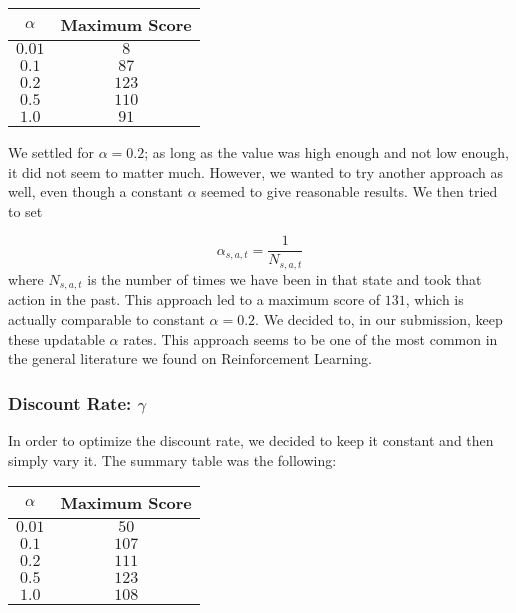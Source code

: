\documentclass[10pt]{article}
\begin{document}
\medskip

\begin{center} 
\begin{tabular}{c|c} 
\hline
$\alpha$ & Maximum Score \\ \hline
$0.01$ & $8$ \\ \hline
$0.1$  & $87$ \\ \hline 
$0.2$ & $123$ \\ \hline 
$0.5$ & $110$ \\ \hline 
$1.0$ & $91$ \\ \hline 
\end{tabular} 
\end{center}

\medskip

We settled for $\alpha = 0.2$; as long as the value was high enough and not low
enough, it did not seem to matter much. However, we wanted to try another approach as well,
even though a constant $\alpha$ seemed to give reasonable results. We then tried to
set 

\[ \alpha_{s,a,t} = \frac{1}{N_{s,a,t}} \]
where $N_{s,a,t}$ is the number of times we have been in that state and took
that action in the past. This approach led to a maximum score of $131$, which
is actually comparable to constant $\alpha = 0.2$. We decided to, in our submission,
keep these updatable $\alpha$ rates. This approach seems to be one of the most
common in the general literature we found on Reinforcement Learning.

\subsubsection{Discount Rate: $\gamma$}

In order to optimize the discount rate, we decided to keep it constant and then
simply vary it. The summary table was the following:

\medskip

\begin{center} 
\begin{tabular}{c|c} 
\hline
$\alpha$ & Maximum Score \\ \hline
$0.01$ & $50$ \\ \hline
$0.1$  &  $107$ \\ \hline 
$0.2$ & $111$ \\ \hline 
$0.5$ & $123$ \\ \hline 
$1.0$ & $108$ \\ \hline 
\end{tabular} 
\end{center}
\end{document}
